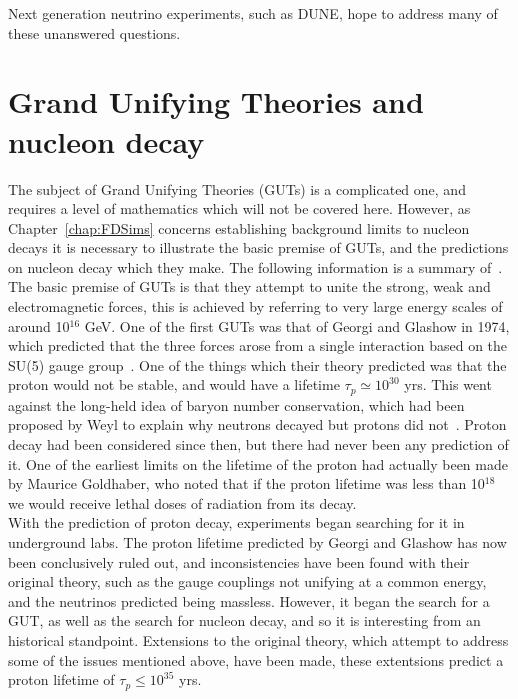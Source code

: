 Next generation neutrino experiments, such as DUNE, hope to address many of these unanswered questions. \\

\section{Grand Unifying Theories and nucleon decay}  \label{sec:Theory_GUT} %
The subject of Grand Unifying Theories (GUTs) is a complicated one, and requires a level of mathematics which will not be covered here. However, as Chapter~\ref{chap:FDSims} concerns establishing background limits to nucleon decays it is necessary to illustrate the basic premise of GUTs, and the predictions on nucleon decay which they make. The following information is a summary of~\citep{Senjanovic:2009kr}. \\

The basic premise of GUTs is that they attempt to unite the strong, weak and electromagnetic forces, this is achieved by referring to very large energy scales of around 10$^16$ GeV. One of the first GUTs was that of Georgi and Glashow in 1974, which predicted that the three forces arose from a single interaction based on the SU(5) gauge group~\citep{PhysRevLett.32.438}. One of the things which their theory predicted was that the proton would not be stable, and would have a lifetime $\tau_{p} \simeq 10^{30}$ yrs. This went against the long-held idea of baryon number conservation, which had been proposed by Weyl to explain why neutrons decayed but protons did not~\citep{Weyl1929}. Proton decay had been considered since then, but there had never been any prediction of it. One of the earliest limits on the lifetime of the proton had actually been made by Maurice Goldhaber, who noted that if the proton lifetime was less than 10$^{18}$ we would receive lethal doses of radiation from its decay. \\

With the prediction of proton decay, experiments began searching for it in underground labs. The proton lifetime predicted by Georgi and Glashow has now been conclusively ruled out, and inconsistencies have been found with their original theory, such as the gauge couplings not unifying at a common energy, and the neutrinos predicted being massless. However, it began the search for a GUT, as well as the search for nucleon decay, and so it is interesting from an historical standpoint. Extensions to the original theory, which attempt to address some of the issues mentioned above, have been made, these extentsions predict a proton lifetime of $\tau_{p} \leq 10^{35}$ yrs. \\

